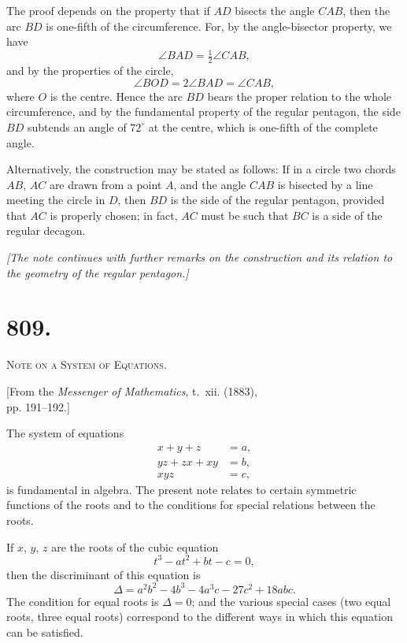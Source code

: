 \documentclass[11pt,a4paper]{book}
\begin{document}
The proof depends on the property that if $AD$ bisects the angle $CAB$, then the arc $BD$ is one-fifth of the circumference. For, by the angle-bisector property, we have
\[
\angle BAD = \tfrac{1}{2}\angle CAB,
\]
and by the properties of the circle,
\[
\angle BOD = 2\angle BAD = \angle CAB,
\]
where $O$ is the centre. Hence the arc $BD$ bears the proper relation to the whole circumference, and by the fundamental property of the regular pentagon, the side $BD$ subtends an angle of $72^\circ$ at the centre, which is one-fifth of the complete angle.

Alternatively, the construction may be stated as follows: If in a circle two chords $AB$, $AC$ are drawn from a point $A$, and the angle $CAB$ is bisected by a line meeting the circle in $D$, then $BD$ is the side of the regular pentagon, provided that $AC$ is properly chosen; in fact, $AC$ must be such that $BC$ is a side of the regular decagon.

\vspace{0.5cm}
\noindent\textit{[The note continues with further remarks on the construction and its relation to the geometry of the regular pentagon.]}
\vspace{0.5cm}



\newpage
\section*{809.}
\begin{center}
{\large\scshape Note on a System of Equations.}
\end{center}

\begin{flushright}
\small[From the \textit{Messenger of Mathematics}, t.~xii. (1883),\\
pp. 191--192.]
\end{flushright}

The system of equations
\[
\begin{aligned}
x + y + z &= a, \\
yz + zx + xy &= b, \\
xyz &= c,
\end{aligned}
\]
is fundamental in algebra. The present note relates to certain symmetric functions of the roots and to the conditions for special relations between the roots.

If $x$, $y$, $z$ are the roots of the cubic equation
\[
t^3 - at^2 + bt - c = 0,
\]
then the discriminant of this equation is
\[
\Delta = a^2b^2 - 4b^3 - 4a^3c - 27c^2 + 18abc.
\]
The condition for equal roots is $\Delta = 0$; and the various special cases (two equal roots, three equal roots) correspond to the different ways in which this equation can be satisfied.
\end{document}
